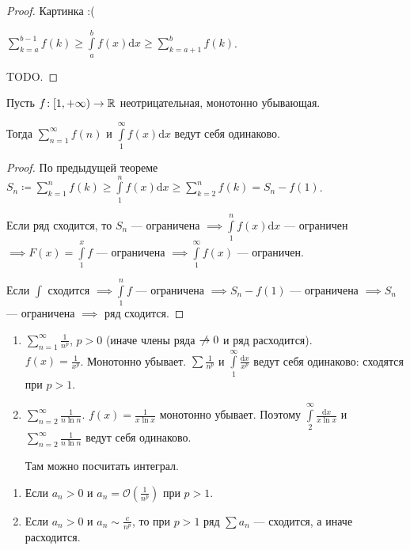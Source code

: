 \begin{proof}
    Картинка :(
    
     $\sum\limits_{k=a}^{b-1} f(k) \ge \int\limits_a^b f(x)\mathrm{d}x \ge \sum\limits_{k=a+1}^b f(k)$.

     TODO.
\end{proof}
\begin{theorem}
    Пусть $f\!:[1, +\infty) \to \mathbb{R}$ неотрицательная, монотонно убывающая. 

    Тогда  $\sum\limits_{n=1}^\infty f(n)$ и  $\int\limits_1^\infty f(x) \mathrm{d}x$ ведут себя одинаково.
\end{theorem}
\begin{proof}
    По предыдущей теореме $S_n \coloneqq \sum\limits_{k=1}^n f(k) \ge \int\limits_1^n f(x)\mathrm{d}x \ge \sum\limits_{k=2}^n f(k) = S_n - f(1)$.

    Если ряд сходится, то $S_n$ --- ограничена  $\implies \int\limits_1^n f(x)\mathrm{d}x$ --- ограничен $\implies F(x) = \int\limits_1^x f$ --- ограничена $\implies \int\limits_1^\infty f(x)$ --- ограничен.

    Если  $\int$ сходится $\implies \int\limits_1^n f$ --- ограничена  $\implies S_n - f(1)$ --- ограничена  $\implies S_n$ --- ограничена $\implies$ ряд сходится.
\end{proof}
\begin{example}
     \begin{enumerate}
         \item $\sum\limits_{n=1}^\infty \frac{1}{n^p}$, $p > 0$ (иначе члены ряда $\centernot \to 0$ и ряд расходится).\\
             $f(x) = \frac{1}{x^p}$. Монотонно убывает. $\sum \frac{1}{n^p}$ и $\int\limits_1^\infty \frac{\mathrm{d}x}{x^p}$ ведут себя одинаково: сходятся при  $p > 1$.
         \item $\sum\limits_{n=2}^\infty \frac{1}{n\ln n}$. $f(x) = \frac{1}{x\ln x}$ монотонно убывает. Поэтому $\int\limits_2^\infty \frac{\mathrm{d}x}{x\ln x}$ и $\sum\limits_{n=2}^\infty \frac{1}{n \ln n}$ ведут себя одинаково. 

             Там можно посчитать интеграл.
    \end{enumerate}
\end{example}
\begin{consequence}
    \begin{enumerate}
        \item Если $a_n > 0$ и  $a_n = \mathcal{O}(\frac{1}{n^p})$ при $p > 1$.
        \item Если  $a_n > 0$ и  $a_n \sim \frac{c}{n^p}$, то при $p > 1$ ряд  $\sum a_n$ --- сходится, а иначе расходится.
    \end{enumerate}
\end{consequence}
